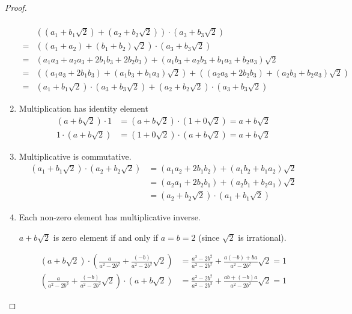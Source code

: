 \begin{proof}
\begin{enumerate}[label = (\arabic*)]
\begin{align*}
		      \end{align*}
		      \begin{align*}
			        & \left((a_{1} + b_{1}\sqrt{2}) + (a_{2} + b_{2}\sqrt{2})\right)\cdot (a_{3} + b_{3}\sqrt{2})                                                               \\
			      = & \left((a_{1} + a_{2}) + (b_{1} + b_{2})\sqrt{2}\right)\cdot (a_{3} + b_{3}\sqrt{2})                                                                       \\
			      = & \left(a_{1}a_{3} + a_{2}a_{3} + 2b_{1}b_{3} + 2b_{2}b_{3}\right) + (a_{1}b_{3} + a_{2}b_{3} + b_{1}a_{3} + b_{2}a_{3})\sqrt{2}                            \\
			      = & \left((a_{1}a_{3} + 2b_{1}b_{3}) + (a_{1}b_{3} + b_{1}a_{3})\sqrt{2}\right) + \left((a_{2}a_{3} + 2b_{2}b_{3}) + (a_{2}b_{3} + b_{2}a_{3})\sqrt{2}\right) \\
			      = & (a_{1} + b_{1}\sqrt{2})\cdot (a_{3} + b_{3}\sqrt{2}) + (a_{2} + b_{2}\sqrt{2})\cdot (a_{3} + b_{3}\sqrt{2})
		      \end{align*}
		\item Multiplication has identity element
		      \begin{align*}
			      (a + b\sqrt{2})\cdot 1 & = (a + b\sqrt{2})\cdot (1 + 0\sqrt{2}) = a + b\sqrt{2} \\
			      1\cdot (a + b\sqrt{2}) & = (1 + 0\sqrt{2})\cdot (a + b\sqrt{2}) = a + b\sqrt{2}
		      \end{align*}
		\item Multiplicative is commutative.
		      \begin{align*}
			      (a_{1} + b_{1}\sqrt{2})\cdot (a_{2} + b_{2}\sqrt{2}) & = (a_{1}a_{2} + 2b_{1}b_{2}) + (a_{1}b_{2} + b_{1}a_{2})\sqrt{2} \\
			                                                           & = (a_{2}a_{1} + 2b_{2}b_{1}) + (a_{2}b_{1} + b_{2}a_{1})\sqrt{2} \\
			                                                           & = (a_{2} + b_{2}\sqrt{2})\cdot (a_{1} + b_{1}\sqrt{2})
		      \end{align*}
		\item Each non-zero element has multiplicative inverse.

		      $a + b\sqrt{2}$ is zero element if and only if $a = b = 2$ (since $\sqrt{2}$ is irrational).

		      \begin{align*}
			      (a + b\sqrt{2})\cdot \left( \frac{a}{a^{2} - 2b^{2}} + \frac{(-b)}{a^{2} - 2b^{2}}\sqrt{2} \right) & = \frac{a^{2} - 2b^{2}}{a^{2} - 2b^{2}} + \frac{a(-b) + ba}{a^{2} - 2b^{2}}\sqrt{2} = 1 \\
			      \left( \frac{a}{a^{2} - 2b^{2}} + \frac{(-b)}{a^{2} - 2b^{2}}\sqrt{2} \right)\cdot (a + b\sqrt{2}) & = \frac{a^{2} - 2b^{2}}{a^{2} - 2b^{2}} + \frac{ab + (-b)a}{a^{2} - 2b^{2}}\sqrt{2} = 1
		      \end{align*}
	\end{enumerate}
\end{proof}

